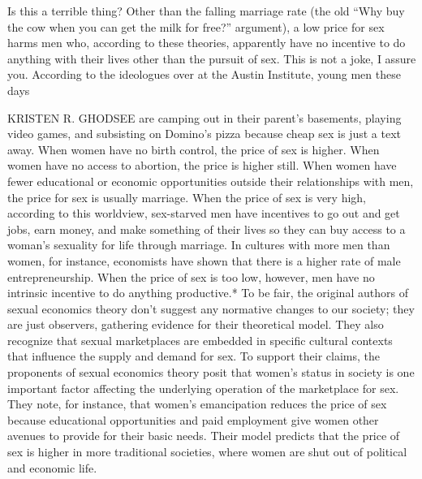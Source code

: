  \par 
Is this a terrible thing? Other than the falling marriage rate (the old “Why buy the cow when you can get the milk for free?” argument), a low price for sex harms men who, according to these theories, apparently have no incentive to do anything with their lives other than the pursuit of sex. This is not a joke, I assure you. According to the ideologues over at the Austin Institute, young men these days
 \par 
KRISTEN R. GHODSEE are camping out in their parent’s basements, playing video games, and subsisting on Domino’s pizza because cheap sex is just a text away. When women have no birth control, the price of sex is higher. When women have no access to abortion, the price is higher still. When women have fewer educational or economic opportunities outside their relationships with men, the price for sex is usually marriage. When the price of sex is very high, according to this worldview, sex-starved men have incentives to go out and get jobs, earn money, and make something of their lives so they can buy access to a woman’s sexuality for life through marriage. In cultures with more men than women, for instance, economists have shown that there is a higher rate of male entrepreneurship. When the price of sex is too low, however, men have no intrinsic incentive to do anything productive.* To be fair, the original authors of sexual economics theory don’t suggest any normative changes to our society; they are just observers, gathering evidence for their theoretical model. They also recognize that sexual marketplaces are embedded in specific cultural contexts that influence the supply and demand for sex. To support their claims, the proponents of sexual economics theory posit that women’s status in society is one important factor affecting the underlying operation of the marketplace for sex. They note, for instance, that women’s emancipation reduces the price of sex because educational opportunities and paid employment give women other avenues to provide for their basic needs. Their model predicts that the price of sex is higher in more traditional societies, where women are shut out of political and economic life.
 \par 
